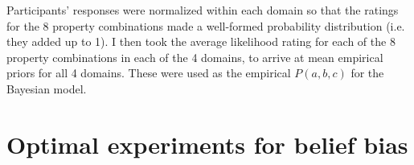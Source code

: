 \documentclass{llncs} %
\newcommand{\denote}[1]{\mbox{ $[\![ #1 ]\!]$}}
\begin{document}
Participants' responses were normalized within each domain so that the ratings for the 8 property combinations made a well-formed probability distribution (i.e. they added up to 1). I then took the average likelihood rating for each of the 8 property combinations in each of the 4 domains, to arrive at mean empirical priors for all 4 domains. These were used as the empirical $P(a,b,c)$ for the Bayesian model. 








\section{Optimal experiments for belief bias}
\end{document}
